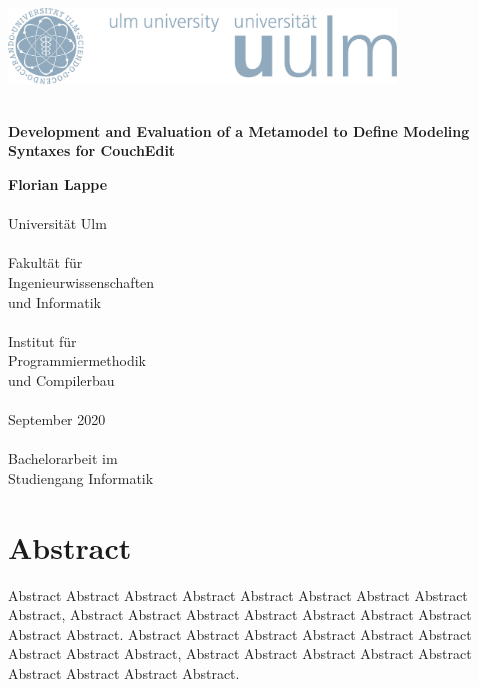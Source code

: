 \documentclass[
a4paper,
numbers=noenddot,      %
bibliography=totoc,              %
BCOR=15mm,               %
leqno					%
]{scrbook}
\newcommand{\fullname}{Florian Lappe}
\newcommand{\titel}{}
\newcommand{\untertitel}{Development and Evaluation of a Metamodel to Define Modeling Syntaxes for CouchEdit}
\newcommand{\abgabedatum}{September 2020}
\newcommand{\abschlussarbeit}{Bachelorarbeit}
\begin{document}
\frontmatter %


\begin{titlepage}
  \selectfont %
  \hfill\includegraphics[height=2.0cm]{images/logo_100_sRGB}\\[3.5cm] %
  \begin{flushright}
    \Huge \textbf{\titel}\\[0.2cm]
    \fontsize{19}{20}\selectfont \textbf{\untertitel}\\
  \end{flushright}

  \vfill\hfill
  \parbox[t]{4.6cm}{
  \singlespacing
  \large
  \textbf{\fullname}\\
  \\
  Universität Ulm\\
  \\
  Fakultät für\\
  Ingenieurwissenschaften\\
  und Informatik\\
  \\
  Institut für\\
  Programmiermethodik\\
  und Compilerbau\\
  \\
  \abgabedatum\\
  \\
  {\abschlussarbeit} im\\
  Studiengang Informatik
  }
\end{titlepage}
\restoregeometry


\clearpage
\thispagestyle{empty}
\chapter*{Abstract}


Abstract Abstract Abstract Abstract Abstract Abstract Abstract Abstract Abstract,
Abstract Abstract Abstract Abstract Abstract Abstract Abstract Abstract Abstract.
Abstract Abstract Abstract Abstract Abstract Abstract Abstract Abstract Abstract,
Abstract Abstract Abstract Abstract Abstract Abstract Abstract Abstract Abstract.
\end{document}
